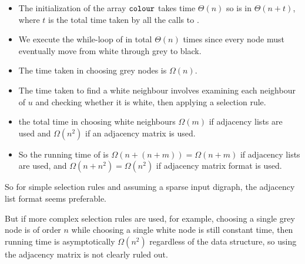 \begin{itemize}
\item The initialization of the array $\colour$ takes time 
$\Theta(n)$ so  
is in $\Theta(n + t)$, where $t$ is the total time taken by all 
the calls to .

\item We execute the while-loop of  in total $\Theta(n)$ times since every node
must eventually move from white through grey to black. 

\item The time taken in choosing grey nodes is
$\Omega(n)$. 

\item The time taken to find a white neighbour involves examining each  neighbour of $u$ and checking whether it is
white, then applying a selection rule. 

\item  the total 
time in
choosing white neighbours $\Omega(m)$ if adjacency lists
are used and $\Omega(n^2)$ if an adjacency matrix is used.

\item So the running time of  is $\Omega(n + (n+m)) = \Omega(n + m)$
if adjacency lists are used, and $\Omega(n + n^2) = \Omega(n^2)$ if adjacency matrix format is used.

\end{itemize}

So for simple selection rules and assuming a sparse input digraph, the adjacency list format seems
preferable. 

But if more complex selection rules are used, for example, choosing a single grey node is 
of order $n$ while choosing a single white node is still constant time, then running time is 
asymptotically $\Omega(n^2)$ regardless of the data structure, so using
the adjacency matrix is not clearly ruled out.

